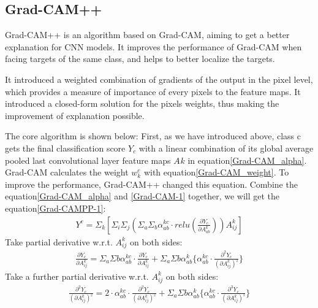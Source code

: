 \documentclass[conference]{IEEEtran}
\begin{document}
\subsection{Grad-CAM++}
Grad-CAM++ is an algorithm based on Grad-CAM, aiming to get a better explanation for CNN models. It improves the performance of Grad-CAM when facing targets of the same class, and helps to better localize the targets.\par
It introduced a weighted combination of gradients of the output in the pixel level, which provides a measure of importance of every pixels to the feature maps.
It introduced a closed-form solution for the pixels weights, thus making the improvement of explanation possible. \par
The core algorithm is shown below:
First, as we have introduced above, class c gets the final classification score $Y_{c}$ with a linear combination of its global average pooled last convolutional layer feature maps $A_{}k$ in equation\ref{Grad-CAM_alpha}.
Grad-CAM calculates the weight $w_{k}^{c}$ with equation\ref{Grad-CAM_weight}.  To improve the performance, Grad-CAM++ changed this equation.
Combine the equation\ref{Grad-CAM_alpha} and \ref{Grad-CAM-1} together, we will get the equation\ref{Grad-CAMPP-1}:
\begin{equation}
    \begin{aligned}
        Y^{c}=\Sigma_{k}[\Sigma_{i}\Sigma_{j}(\Sigma_{a}\Sigma_{b}\alpha_{ab}^{kc}·relu(\frac{\partial Y_{c}}{\partial A_{ab}^{k}}))A_{ij}^{k}]
        \label{Grad-CAMPP-1}
    \end{aligned}
\end{equation}
Take partial derivative w.r.t. $A_{ij}^{k}$ on both sides:
\begin{equation}
\begin{aligned}
    \frac{\partial Y_{c}}{\partial A_{ij}^{k}}=\Sigma_{a}\Sigma{b}\alpha_{ab}^{kc}·\frac{\partial Y_{c}}{\partial A_{ij}^{k}}+\Sigma_{a}\Sigma{b}\alpha_{ab}^{k}\{\alpha_{ab}^{kc}·\frac{\partial^{2} Y_{c}}{(\partial A_{ij}^{k})^_{2}}\}
    \label{Grad-CAMPP-2}
\end{aligned}
\end{equation}
Take a further partial derivative w.r.t. $A_{ij}^{k}$ on both sides:
\begin{equation}
    \begin{aligned}
        \frac{\partial^{2} Y_{c}}{(\partial A_{ij}^{k})^_{2}}=2·\alpha_{ab}^{kc}·\frac{\partial^{2} Y_{c}}{(\partial A_{ij}^{k})^_{2}}+\Sigma_{a}\Sigma{b}\alpha_{ab}^{k}\{\alpha_{ab}^{kc}·\frac{\partial^{3} Y_{c}}{(\partial A_{ij}^{k})^_{3}}\}
        \label{Grad-CAMPP-3}
    \end{aligned}
    \end{equation}
\end{document}

